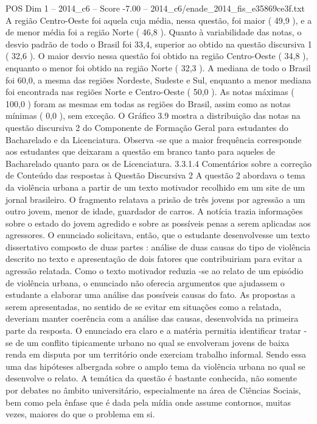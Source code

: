 \begin{textsample}{POS Dim 1 – 2014\_c6 – Score -7.00 – 2014\_c6/enade\_2014\_fis\_e35869ce3f.txt}
A região Centro-Oeste foi aquela cuja média, nessa questão, foi maior ( 49,9 ), e a de menor média foi a região Norte ( 46,8 ).
Quanto à variabilidade das notas, o desvio padrão de todo o Brasil foi 33,4, superior ao obtido na questão discursiva 1 ( 32,6 ).
O maior desvio nessa questão foi obtido na região Centro-Oeste ( 34,8 ), enquanto o menor foi obtido na região Norte ( 32,3 ).
A mediana de todo o Brasil foi 60,0, a mesma das regiões Nordeste, Sudeste e Sul, enquanto a menor mediana foi encontrada nas regiões Norte e Centro-Oeste ( 50,0 ).
As notas máximas ( 100,0 ) foram as mesmas em todas as regiões do Brasil, assim como as notas mínimas ( 0,0 ), sem exceção.
O Gráfico 3.9 mostra a distribuição das notas na questão discursiva 2 do Componente de Formação Geral para estudantes do Bacharelado e da Licenciatura.
Observa -se que a maior frequência corresponde aos estudantes que deixaram a questão em branco tanto para aqueles de Bacharelado quanto para os de Licenciatura. 3.3.1.4 Comentários sobre a correção de Conteúdo das respostas à Questão Discursiva 2 A questão 2 abordava o tema da violência urbana a partir de um texto motivador recolhido em um site de um jornal brasileiro.
O fragmento relatava a prisão de três jovens por agressão a um outro jovem, menor de idade, guardador de carros.
A notícia trazia informações sobre o estado do jovem agredido e sobre as possíveis penas a serem aplicadas aos agressores.
O enunciado solicitava, então, que o estudante desenvolvesse um texto dissertativo composto de duas partes : análise de duas causas do tipo de violência descrito no texto e apresentação de dois fatores que contribuiriam para evitar a agressão relatada.
Como o texto motivador reduzia -se ao relato de um episódio de violência urbana, o enunciado não oferecia argumentos que ajudassem o estudante a elaborar uma análise das possíveis causas do fato.
As propostas a serem apresentadas, no sentido de se evitar em situações como a relatada, deveriam manter coerência com a análise das causas, desenvolvida na primeira parte da resposta.
O enunciado era claro e a matéria permitia identificar tratar -se de um conflito tipicamente urbano no qual se envolveram jovens de baixa renda em disputa por um território onde exerciam trabalho informal.
Sendo essa uma das hipóteses albergada sobre o amplo tema da violência urbana no qual se desenvolve o relato.
A temática da questão é bastante conhecida, não somente por debates no âmbito universitário, especialmente na área de Ciências Sociais, bem como pela ênfase que é dada pela mídia onde assume contornos, muitas vezes, maiores do que o problema em si.

\end{textsample}
